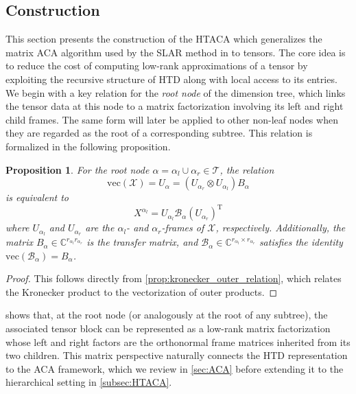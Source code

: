 \documentclass{article}
\theoremstyle{plain}
\newtheorem{proposition}[theorem]{Proposition}
\theoremstyle{definition}
\theoremstyle{remark}
\begin{document}
\subsection{Construction}\label{sec:Construction}

This section presents the construction of the HTACA which generalizes the matrix ACA algorithm used by the SLAR method in \cite{zheng2025semi} to tensors. The core idea is to reduce the cost of computing low-rank approximations of a tensor by exploiting the recursive structure of HTD along with local access to its entries. We begin with a key relation for the \emph{root node} of the dimension tree, which links the tensor data at this node to a matrix factorization involving its left and right child frames. The same form will later be applied to other non-leaf nodes when they are regarded as the root of a corresponding subtree. This relation is formalized in the following proposition.


\begin{proposition}\label{prop:HTACA_foundation}
    For the root node $\alpha = \alpha_l \cup \alpha_r \in \mathcal{T}$, the relation
    \begin{equation}\label{eq:HTACA_foundation_1}
        \mathrm{vec}(\mathcal{X}) = U_{\alpha} = (U_{\alpha_r} \otimes U_{\alpha_l}) B_{\alpha}
    \end{equation}
    is equivalent to
    \begin{equation}\label{eq:HTACA_foundation_final}
        X^{\alpha_l} = U_{\alpha_l} \mathcal{B}_{\alpha} (U_{\alpha_r})^{\mathrm{T}}
    \end{equation}
    where $U_{\alpha_l}$ and $U_{\alpha_r}$ are the $\alpha_l$- and $\alpha_r$-frames of $\mathcal{X}$, respectively. Additionally, the matrix $B_{\alpha} \in \mathbb{C}^{r_{\alpha_l}r_{\alpha_r}}$ is the transfer matrix, and $\mathcal{B}_{\alpha} \in \mathbb{C}^{r_{\alpha_l} \times r_{\alpha_r}}$ satisfies the identity $\mathrm{vec}(\mathcal{B}_{\alpha}) = B_{\alpha}$.
\end{proposition}

\begin{proof}
This follows directly from \cref{prop:kronecker_outer_relation}, which relates the Kronecker product to the vectorization of outer products.
\end{proof}

\noindent {} shows that, at the root node (or analogously at the root of any subtree), the associated tensor block can be represented as a low-rank matrix factorization whose left and right factors are the orthonormal frame matrices inherited from its two children. This matrix perspective naturally connects the HTD representation to the ACA framework, which we review in \cref{sec:ACA} before extending it to the hierarchical setting in \cref{subsec:HTACA}.
\end{document}
